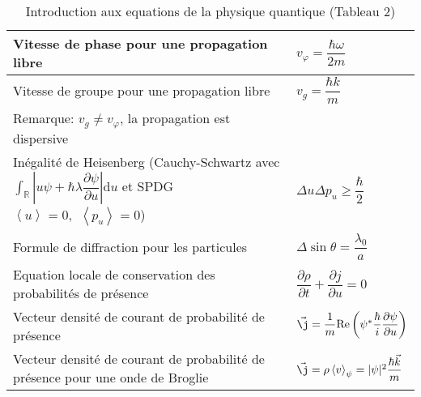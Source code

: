 \documentclass[10pt,a4paper,titlepage,landscape]{article}
\renewcommand{\d}
{
    \mathrm{d}
}
\newcommand*{\dpv}[2]
{
    \dfrac{\partial#1}{\partial#2}
}
\newcommand{\av}[2]
{
    \left\langle#1\right\rangle_{#2}
}
\newcommand{\rint}
{
    \int_{\mathbb{R}}
}
\begin{document}
\begin{table}[H]
\begin{tabular}{@{}|p{9cm}|p{10cm}@{}|}
    Vitesse de phase pour une propagation libre & $v_{\varphi} = \dfrac{\hbar \omega}{2m}$ \\ \hline
    Vitesse de groupe pour une propagation libre & $v_g = \dfrac{\hbar k}{m}$ \\ \hline
    Remarque: $v_g \neq v_\varphi$, la propagation est dispersive & \\ \hline 
    Inégalité de Heisenberg (Cauchy-Schwartz avec $\displaystyle \rint \left|u\psi + \hbar \lambda\dpv{\psi}{u}\right| \d u$ et SPDG $\av{u}{} = 0,\ \ \av{p_u}{} = 0$) & $\Delta u \Delta p_u \geqslant \dfrac{\hbar}{2}$ \\ \hline
    Formule de diffraction pour les particules & $\Delta \sin\theta = \dfrac{\lambda_0}{a}$ \\ \hline
    Equation locale de conservation des probabilités de présence & $\dpv{\rho}{t} + \dpv{j}{u} = 0 $ \\ \hline
    Vecteur densité de courant de probabilité de présence & $\vec {\j} = \dfrac{1}{m}\mathrm{Re}\left(\psi^*\dfrac{\hbar}{i} \dpv{\psi}{u} \right)$ \\ \hline
    Vecteur densité de courant de probabilité de présence pour une onde de Broglie & $\vec {\j} = \rho \av{v}{\psi} = |\psi|^2 \dfrac{\hbar \vec k}{m}$ \\ \hline

\end{tabular}
\caption{Introduction aux equations de la physique quantique (Tableau 2)}
\label{tab:quantphis}
\end{table}
\end{document}
